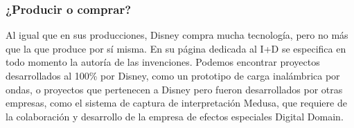 \subsubsection{¿Producir o comprar?}
Al igual que en sus producciones, Disney compra mucha tecnología, pero no más que la que produce por sí misma. En su página dedicada al I+D se especifica en todo momento la autoría de las invenciones. Podemos encontrar proyectos desarrollados al 100\% por Disney, como un prototipo de carga inalámbrica por ondas, o proyectos que pertenecen a Disney pero fueron desarrollados por otras empresas, como el sistema de captura de interpretación Medusa, que requiere de la colaboración y desarrollo de la empresa de efectos especiales Digital Domain.